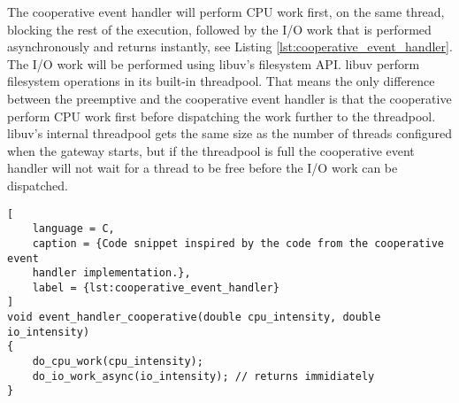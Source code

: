 The cooperative event handler will perform CPU work first, on the same thread,
blocking the rest of the execution, followed by the I/O work that is performed
asynchronously and returns instantly, see Listing
\ref{lst:cooperative_event_handler}. The I/O work will be performed using
libuv's filesystem API. libuv perform filesystem operations in its built-in
threadpool. That means the only difference between the preemptive and the
cooperative event handler is that the cooperative perform CPU work first before
dispatching the work further to the threadpool. libuv's internal threadpool
gets the same size as the number of threads configured when the gateway starts,
but if the threadpool is full the cooperative event handler will not wait for a
thread to be free before the I/O work can be dispatched.

\begin{lstlisting}[
    language = C,
    caption = {Code snippet inspired by the code from the cooperative event
    handler implementation.},
    label = {lst:cooperative_event_handler}
]
void event_handler_cooperative(double cpu_intensity, double io_intensity)
{
    do_cpu_work(cpu_intensity);
    do_io_work_async(io_intensity); // returns immidiately
}
\end{lstlisting}

